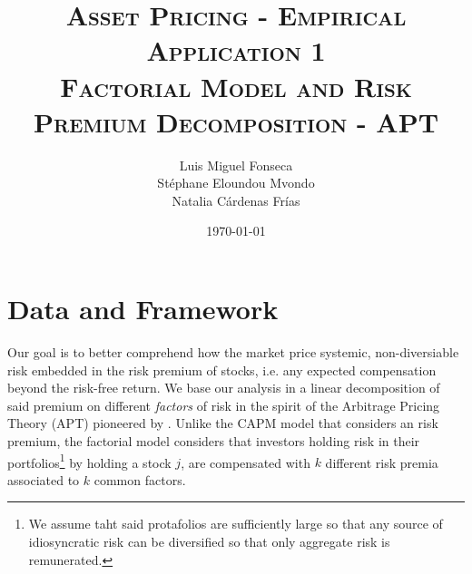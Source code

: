 \documentclass[hidelinks,12pts]{article}
\DeclareMathOperator{\1}{\mathbbm{1}}
\begin{document}
        \title{\scshape{Asset Pricing - Empirical Application 1\\Factorial Model and Risk Premium Decomposition - APT }}%
        \author{Luis Miguel Fonseca \\ Stéphane Eloundou Mvondo\\ Natalia Cárdenas Frías }
        \date{\today}
        \maketitle 






\section{Data and Framework}

Our goal is to better comprehend how the market price systemic, non-diversiable risk embedded in the risk premium of stocks, i.e. any expected compensation beyond the risk-free return.
We base our analysis in a linear decomposition of said premium on different \emph{factors} of risk in the spirit of the Arbitrage Pricing Theory (APT) pioneered by \cite{rossArbitrageTheoryCapital1976}. 
Unlike the CAPM model that considers an risk premium, the factorial model considers that investors holding risk in their portfolios\footnote{We assume taht said protafolios are sufficiently large so that any source of idiosyncratic risk can be diversified so that only aggregate risk is remunerated.} by holding a stock $j$, are compensated with $k$ different risk premia associated to $k$ common factors.%
\end{document}
